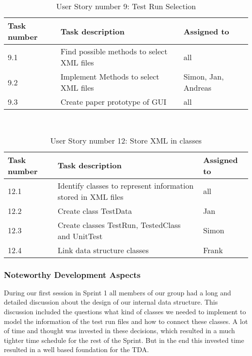 \begin{table}[h]
  \caption{User Story number 9: Test Run Selection}
  \label{US_Selection}
  \centering
  \begin{tabular}{p{1.5cm}|p{9cm}|p{3cm}|}
  	Task number & Task description & Assigned to \\ 
  	\hline
  	\hline
  	9.1 & Find possible methods to select XML files & all \\ 
  	\hline
  	9.2 & Implement Methods to select XML files & Simon, Jan, Andreas \\ 
  	\hline
  	9.3 & Create paper prototype of GUI & all \\
  	\hline
  \end{tabular}
\end{table} 

\ \\ 

\begin{table}[h]
  \caption{User Story number 12: Store XML in classes}
  \label{US_Storage}
  \centering
  \begin{tabular}{p{1.5cm}|p{9cm}|p{3cm}|}
  	Task number & Task description & Assigned to \\ 
  	\hline
  	\hline
  	12.1 & Identify classes to represent information stored in XML files & all \\ 
  	\hline
  	12.2 & Create class TestData & Jan \\ 
  	\hline
  	12.3 & Create classes TestRun, TestedClass and UnitTest & Simon \\ 
  	\hline
  	12.4 & Link data structure classes & Frank \\ 
  	\hline
  \end{tabular}
\end{table} 

\subsubsection*{Noteworthy Development Aspects}

During our first session in Sprint 1 all members of our group had a long and detailed discussion about the design of our internal data structure. This discussion included the questions what kind of classes we needed to implement to model the information of the test run files and how to connect these classes. A lot of time and thought was invested in these decisions, which resulted in a much tighter time schedule for the rest of the Sprint. But in the end this invested time resulted in a well based foundation for the TDA. \\ 

